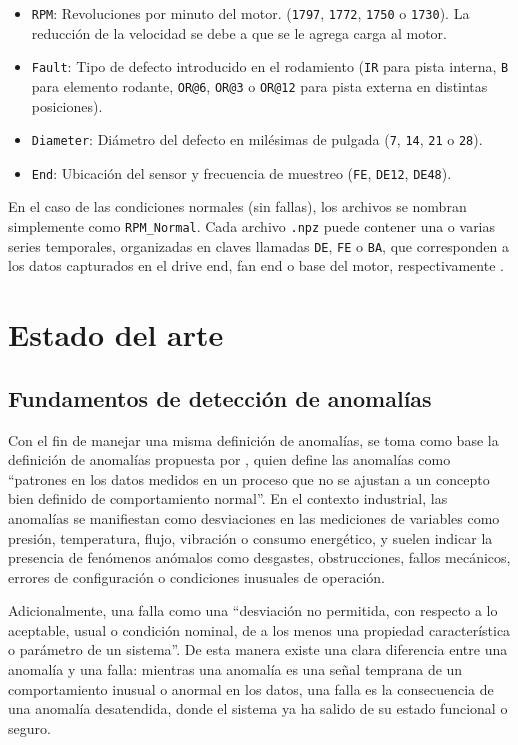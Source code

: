 \documentclass[11pt,a4paper,spanish]{book}
\numberwithin{equation}{chapter}
\numberwithin{figure}{chapter}
\begin{document}
\begin{itemize}
	\item \texttt{RPM}: Revoluciones por minuto del motor. (\texttt{1797}, \texttt{1772}, \texttt{1750} o \texttt{1730}). La reducción de la velocidad se debe a que se le agrega carga al motor.
	\item \texttt{Fault}: Tipo de defecto introducido en el rodamiento (\texttt{IR} para pista interna, \texttt{B} para elemento rodante, \texttt{OR@6}, \texttt{OR@3} o \texttt{OR@12} para pista externa en distintas posiciones).
	\item \texttt{Diameter}: Diámetro del defecto en milésimas de pulgada (\texttt{7}, \texttt{14}, \texttt{21} o \texttt{28}).
	\item \texttt{End}: Ubicación del sensor y frecuencia de muestreo (\texttt{FE}, \texttt{DE12}, \texttt{DE48}).
\end{itemize}


En el caso de las condiciones normales (sin fallas), los archivos se nombran simplemente como \texttt{RPM\_Normal}. 
Cada archivo \texttt{.npz} puede contener una o varias series temporales, organizadas en claves llamadas \texttt{DE}, \texttt{FE} o \texttt{BA}, que corresponden a los datos capturados en el drive end, fan end o base del motor, respectivamente \cite{rigas2024marine}.


\section{Estado del arte}

\subsection{Fundamentos de detección de anomalías}

Con el fin de manejar una misma definición de anomalías, se toma como base la 
definición de anomalías propuesta por \cite{leon2012anomalias}, quien define las 
anomalías como “patrones en los datos medidos en un proceso que no se ajustan a un 
concepto bien definido de comportamiento normal”. 
En el contexto industrial, las anomalías se manifiestan como desviaciones en las 
mediciones de variables como presión, temperatura, flujo, vibración o consumo 
energético, y suelen indicar la presencia de fenómenos anómalos como desgastes, 
obstrucciones, fallos mecánicos, errores de configuración o condiciones inusuales 
de operación.


Adicionalmente, \cite{leon2012anomalias} una falla como una “desviación no 
permitida, con respecto a lo aceptable, usual o condición nominal, de a los 
menos una propiedad característica o parámetro de un sistema”. De esta manera 
existe una clara diferencia entre una anomalía y una falla: mientras una anomalía 
es una señal temprana de un comportamiento inusual o anormal en los datos, una 
falla es la consecuencia de una anomalía desatendida, donde el sistema ya ha 
salido de su estado funcional o seguro. 
\end{document}
